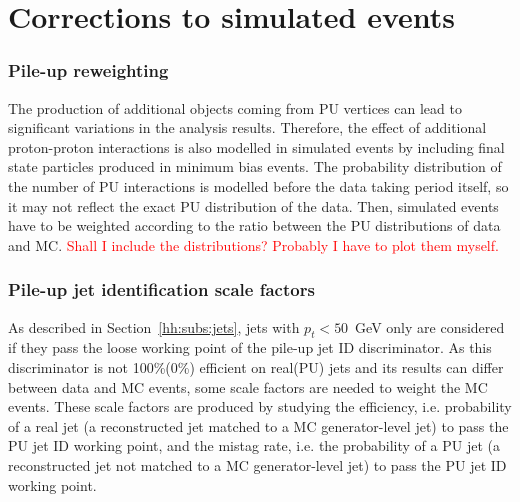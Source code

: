 \documentclass[../main.tex]{subfiles}
\begin{document}
\section{Corrections to simulated events}
\label{hh:sec:corrections}

\subsubsection*{Pile-up reweighting}
\label{hh:sec:pu}

The production of additional objects coming from PU vertices can lead to significant variations in the analysis results. Therefore, the effect of additional proton-proton interactions is also modelled in simulated events by including final state particles produced in minimum bias events. The probability distribution of the number of PU interactions is modelled before the data taking period itself, so it may not reflect the exact PU distribution of the data. Then, simulated events have to be weighted according to the ratio between the PU distributions of data and MC. \textcolor{red}{Shall I include the distributions? Probably I have to plot them myself.}



\subsubsection*{Pile-up jet identification scale factors}

As described in Section~\ref{hh:subs:jets}, jets with $p_t < 50$~GeV only are considered if they pass the loose working point of the pile-up jet ID discriminator. As this discriminator is not 100\%(0\%) efficient on real(PU) jets and its results can differ between data and MC events, some scale factors are needed to weight the MC events. These scale factors are produced by studying the efficiency, i.e. probability of a real jet (a reconstructed jet matched to a MC generator-level jet) to pass the PU jet ID working point, and the mistag rate, i.e. the probability of a PU jet (a reconstructed jet not matched to a MC generator-level jet) to pass the PU jet ID working point.
\end{document}
